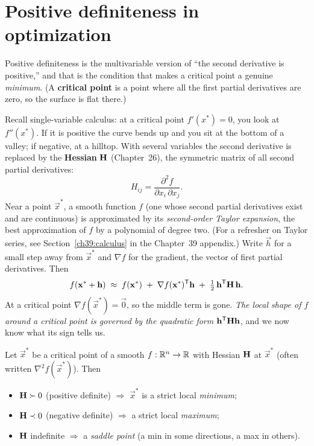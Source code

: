 \section{Positive definiteness in optimization}

Positive definiteness is the multivariable version of ``the second derivative is positive,'' and
that is the condition that makes a critical point a genuine \emph{minimum}. (A \textbf{critical
point} is a point where all the first partial derivatives are zero, so the surface is flat there.)

Recall single-variable calculus: at a critical point $f'(x^*)=0$, you look at $f''(x^*)$. If it is
positive the curve bends up and you sit at the bottom of a valley; if negative, at a hilltop. With
several variables the second derivative is replaced by the \textbf{Hessian} $\mathbf{H}$ (Chapter~26),
the symmetric matrix of all second partial derivatives:
\[
  H_{ij} = \frac{\partial^2 f}{\partial x_i \, \partial x_j}.
\]
Near a point $\vec{x}^*$, a smooth function $f$ (one whose second partial derivatives exist and are
continuous) is approximated by its \emph{second-order Taylor expansion}, the best approximation of
$f$ by a polynomial of degree two. (For a refresher on Taylor series, see
Section~\ref{ch39:calculus} in the Chapter~39 appendix.) Write $\vec{h}$ for a small step away from
$\vec{x}^*$ and $\nabla f$ for the gradient, the vector of first partial derivatives. Then
\[
  f(\mathbf{x}^* + \mathbf{h}) \;\approx\; f(\mathbf{x}^*) \;+\; \nabla f(\mathbf{x}^*)^{\mathsf{T}} \mathbf{h}
  \;+\; \tfrac12\, \mathbf{h}^{\mathsf{T}} \mathbf{H}\, \mathbf{h}.
\]
At a critical point $\nabla f(\vec{x}^*) = \vec{0}$, so the middle term is gone. \emph{The local
shape of $f$ around a critical point is governed by the quadratic form $\mathbf{h}^{\mathsf{T}}\mathbf{H}\mathbf{h}$},
and we now know what its sign tells us.

\begin{theorem}
\label{ch27:thm-secondderiv}
Let $\vec{x}^*$ be a critical point of a smooth $f:\mathbb{R}^n\to\mathbb{R}$ with Hessian $\mathbf{H}$ at $\vec{x}^*$
(often written $\nabla^2 f(\vec{x}^*)$). Then
\begin{itemize}
  \item $\mathbf{H}\succ 0$ (positive definite) $\Rightarrow$ $\vec{x}^*$ is a strict local
  \emph{minimum};
  \item $\mathbf{H}\prec 0$ (negative definite) $\Rightarrow$ a strict local \emph{maximum};
  \item $\mathbf{H}$ indefinite $\Rightarrow$ a \emph{saddle point} (a min in some directions, a max in
  others).
\end{itemize}
\end{theorem}


